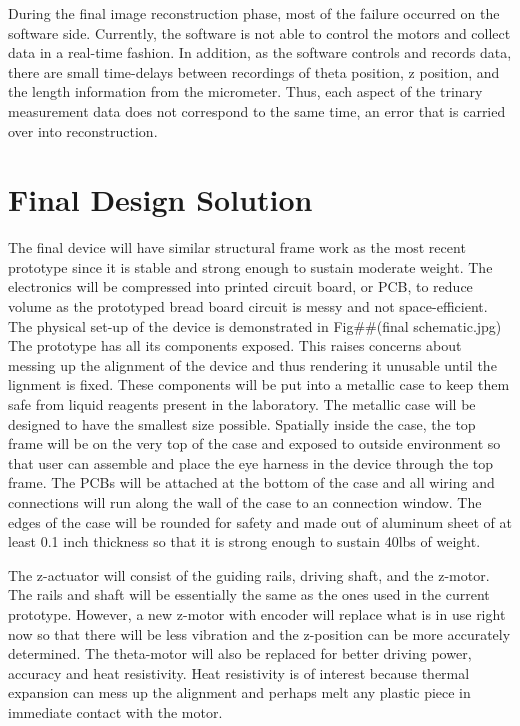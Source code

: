 \documentclass{article}
\begin{document}
	During the final image reconstruction phase, most of the failure occurred on the software side. Currently, the software is not able to control the motors and collect data in a real-time fashion. In addition, as the software controls and records data, there are small time-delays between recordings of theta position, z position, and the length information from the micrometer. Thus, each aspect of the trinary measurement data does not correspond to the same time, an error that is carried over into reconstruction. 







\section{Final Design Solution}
\label{sec:final-design-solut}

The final device will have similar structural frame work as the most recent prototype since it is stable and 
strong enough to sustain moderate weight. The electronics will be compressed into printed circuit board, or 
PCB, to reduce volume as the prototyped bread board circuit is messy and not space-efficient. The 
physical set-up of the device is demonstrated in Fig##(final schematic.jpg) The prototype has all its 
components exposed. This raises concerns about messing up the alignment of the device and thus 
rendering it unusable until the lignment is fixed. These components will be put into a metallic case to keep 
them safe from liquid reagents present in the laboratory. The metallic case will be designed to have the 
smallest size possible. Spatially inside the case, the top frame will be on the very top of the case and 
exposed to outside environment so that user can assemble and place the eye harness in the device 
through the top frame. The PCBs will be attached at the bottom of the case and all wiring and connections 
will run along the wall of the case to an connection window. The edges of the case will be rounded for 
safety and made out of aluminum sheet of at least 0.1 inch thickness so that it is strong enough to sustain 
40lbs of weight. 

The z-actuator will consist of the guiding rails, driving shaft, and the z-motor. The rails and shaft will be essentially the same as the ones used in the current prototype. However, a new z-motor with encoder will replace what is in use right now so that there will be less vibration and the z-position can be more accurately determined. The theta-motor will also be replaced for better driving power, accuracy and heat resistivity. Heat resistivity is of interest because thermal expansion can mess up the alignment and perhaps melt any plastic piece in immediate contact with the motor.
\end{document}
